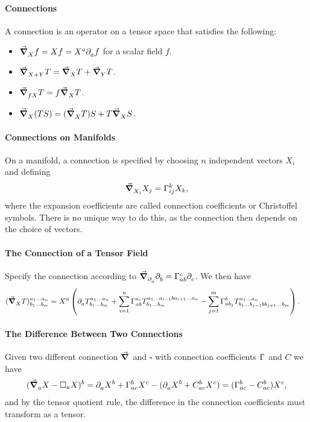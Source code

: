 \paragraph{Connections}
A connection is an operator on a tensor space that satisfies the following:
\begin{itemize}
	\item $\grad_{X}^{}{f} = Xf = X^{a}\partial^{}_{a}f$ for a scalar field $f$.
	\item $\grad_{X + Y}^{}{T} = \grad_{X}^{}{T} + \grad_{Y}^{}{T}$.
	\item $\grad_{fX}^{}{T} = f\grad_{X}^{}{T}$.
	\item $\grad_{X}^{}{(TS)} = (\grad_{X}^{}{T})S + T\grad_{X}^{}{S}$.
\end{itemize}

\paragraph{Connections on Manifolds}
On a manifold, a connection is specified by choosing $n$ independent vectors $X_{i}$ and defining
\begin{align*}
	\dcov{X_{i}}{X_{j}} = \chris{k}{i}{j}X_{k},
\end{align*}
where the expansion coefficients are called connection coefficients or Christoffel symbols. There is no unique way to do this, as the connection then depends on the choice of vectors.

\paragraph{The Connection of a Tensor Field}
Specify the connection according to $\dcov{\del{a}{}}{\del{b}{}} = \chris{c}{a}{b}\del{c}{}$. We then have
\begin{align*}
	\tensor*{(\dcov{X}{T})}{^{a_{1}\dots a_{n}}_{b_{1}\dots b_{m}}} &= X^{a}\left(\del{a}{\tensor*{T}{^{a_{1}\dots a_{n}}_{b_{1}\dots b_{m}}}} + \sum\limits_{i = 1}^{n}\chris{a_{i}}{a}{b}\tensor*{T}{^{a_{1}\dots a_{i - 1}ba_{i + 1}\dots a_{n}}_{b_{1}\dots b_{m}}} - \sum\limits_{j = 1}^{m}\chris{b}{a}{b_{j}}\tensor*{T}{^{a_{1}\dots a_{n}}_{b_{1}\dots b_{j - 1}bb_{j + 1}\dots b_{m}}}\right).
\end{align*}

\paragraph{The Difference Between Two Connections}
Given two different connection $\grad_{}^{}{}$ and $\square$ with connection coefficients $\chris{}{}{}$ and $C$ we have
\begin{align*}
	(\dcov{a}{X} - \square_{a}X)^{b} = \del{a}{X^{b}} + \chris{b}{a}{c}X^{c} - (\del{a}{X^{b}} + C^{b}_{ac}X^{c}) = (\chris{b}{a}{c} - C^{b}_{ac})X^{c},
\end{align*}
and by the tensor quotient rule, the difference in the connection coefficients must transform as a tensor.

